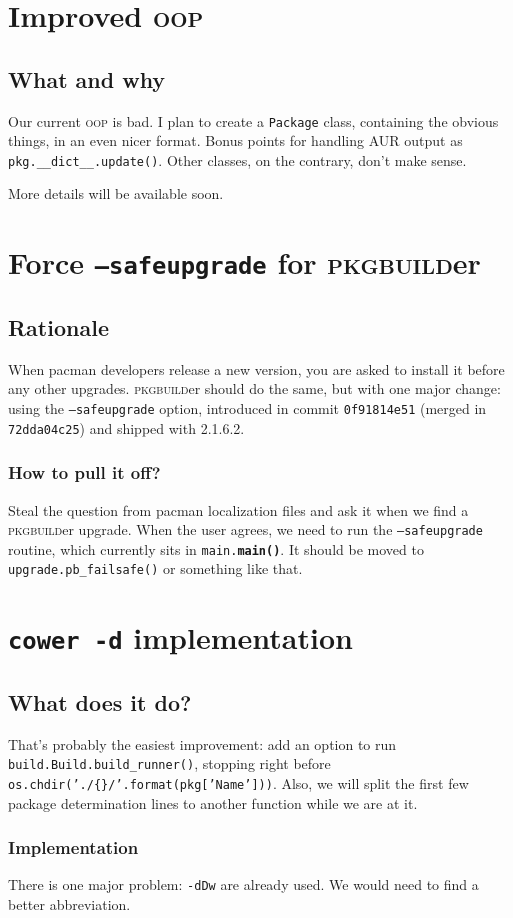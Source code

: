 \documentclass[a4paper,english]{book}
\numberwithin{equation}{section}
\newcommand{\pb}[0]{\textsc{pkgbuild}er}
\newcommand{\p}[1]{\nohyphens{\texttt{#1}}}
\begin{document}
\part{Improved \textsc{oop}}

\chapter{What and why}

Our current \textsc{oop} is bad.  I plan to create a \p{Package} class, containing the obvious things, in an even nicer format.  Bonus points for handling AUR output as \p{pkg.\_\_dict\_\_.update()}.  Other classes, on the contrary, don’t make sense.

\Large More details will be available soon. \normalsize

\part{Force \p{--safeupgrade} for \pb}

\chapter{Rationale}

When pacman developers release a new version, you are asked to install it before any other upgrades.  \pb{} should do the same, but with one major change: using the \p{--safeupgrade} option, introduced in commit \p{0f91814e51} (merged in \p{72dda04c25}) and shipped with \rm 2.1.6.2. \osn

\section{How to pull it off?}

Steal the question from pacman localization files and ask it when we find a \pb{} upgrade.  When the user agrees, we need to run the \p{--safeupgrade} routine, which currently sits in \p{main.\textbf{main()}}.  It should be moved to \p{upgrade.pb\_failsafe()} or something like that.

\part{\p{cower -d} implementation}

\chapter{What does it do?}

That’s probably the easiest improvement: add an option to run \p{build.Build.build\_runner()}, stopping right before \p{os.chdir('./\{\}/'.format(pkg['Name']))}.  Also, we will split the first few package determination lines to another function while we are at it.

\section{Implementation}

There is one major problem: \p{-dDw} are already used.  We would need to find a better abbreviation.
\end{document}
